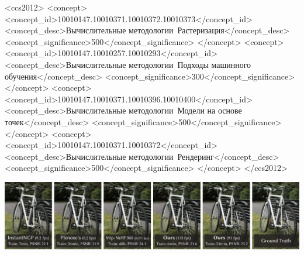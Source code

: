 \documentclass[acmtog]{acmart}
\begin{document}
\begin{CCSXML}
    <ccs2012>
    <concept>
    <concept_id>10010147.10010371.10010372.10010373</concept_id>
    <concept_desc>Вычислительные методологии~Растеризация</concept_desc>
    <concept_significance>500</concept_significance>
    </concept>
    <concept>
    <concept_id>10010147.10010257.10010293</concept_id>
    <concept_desc>Вычислительные методологии~Подходы машинного обучения</concept_desc>
    <concept_significance>300</concept_significance>
    </concept>
    <concept>
    <concept_id>10010147.10010371.10010396.10010400</concept_id>
    <concept_desc>Вычислительные методологии~Модели на основе точек</concept_desc>
    <concept_significance>500</concept_significance>
    </concept>
    <concept>
    <concept_id>10010147.10010371.10010372</concept_id>
    <concept_desc>Вычислительные методологии~Рендеринг</concept_desc>
    <concept_significance>500</concept_significance>
    </concept>
    </ccs2012>
\end{CCSXML}



\begin{teaserfigure}
    \includegraphics[width=\textwidth]{figures/teaser/teaser_02.pdf}
    \caption{
    \label{fig:teaser}
    Наш метод достигает рендеринга радиусных полей в реальном времени с качеством, равным предыдущему методу с наилучшим качеством ~\cite{barron2022mipnerf360}, требуя при этом времени оптимизации только конкурентного с самыми быстрыми предыдущими методами~\cite{plenoxels,mueller2022instant}.
    Ключом к этой производительности является новое представление сцены с помощью 3D Гауссиан в сочетании с дифференцируемым рендером в реальном времени, который обеспечивает значительное ускорение как оптимизации сцены, так и синтеза новых видов.
    Обратите внимание, что для сравнимого времени обучения с InstantNGP ~\cite{mueller2022instant} мы достигаем качество, аналогичное их; хотя это максимальное качество, которое они достигают, обучаясь 51 минуту, мы достигаем передового качества, даже немного лучше, чем Mip-NeRF360~\cite{barron2022mipnerf360}. %
    }
\end{teaserfigure}
\maketitle
\end{document}
